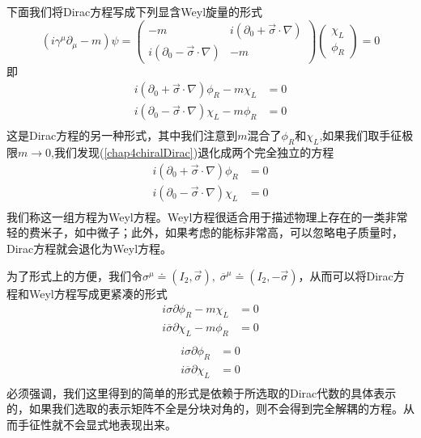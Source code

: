 下面我们将Dirac方程写成下列显含Weyl旋量的形式
\begin{equation}
    (i\gamma^{\mu}\partial_{\mu}-m)\psi=\left(\begin{array}{cc}
       -m  &i(\partial_{0}+\vec{\sigma}\cdot \nabla)  \\
       i(\partial_{0}-\vec{\sigma}\cdot \nabla)   & -m
    \end{array}\right)
    \left(\begin{array}{cc}
         \chi_{L}  \\
         \phi_{R} 
    \end{array}\right)=0
\end{equation}
即
\begin{equation}
\label{chap4chiralDirac}
    \begin{aligned}
    i(\partial_{0}+\vec{\sigma}\cdot \nabla) \phi_{R}-m\chi_{L}&=0\\
    i(\partial_{0}-\vec{\sigma}\cdot \nabla) \chi_{L}-m\phi_{R}&=0\\
    \end{aligned}
\end{equation}
这是Dirac方程的另一种形式，其中我们注意到$m$混合了$\phi_{R}$和$\chi_{L}$,如果我们取手征极限$m\longrightarrow 0$,我们发现(\ref{chap4chiralDirac})退化成两个完全独立的方程
\begin{equation}
\label{chap4chiralDiracm0}
    \begin{aligned}
    i(\partial_{0}+\vec{\sigma}\cdot \nabla) \phi_{R}&=0\\
    i(\partial_{0}-\vec{\sigma}\cdot \nabla) \chi_{L}&=0\\
    \end{aligned}
\end{equation}
我们称这一组方程为Weyl方程。Weyl方程很适合用于描述物理上存在的一类非常轻的费米子，如中微子；此外，如果考虑的能标非常高，可以忽略电子质量时，Dirac方程就会退化为Weyl方程。

为了形式上的方便，我们令$\sigma^{\mu}\doteq(I_{2},\vec{\sigma}),\;\overline{\sigma}^{\mu}\doteq(I_{2},-\vec{\sigma})$，从而可以将Dirac方程和Weyl方程写成更紧凑的形式
\begin{equation}
    \begin{aligned}
    i\sigma\partial \phi_{R}-m\chi_{L}&=0\\
    i\overline{\sigma}\partial \chi_{L}-m\phi_{R}&=0\\
    \end{aligned}
\end{equation}
\begin{equation}
    \begin{aligned}
    i\sigma\partial \phi_{R}&=0\\
    i\overline{\sigma}\partial \chi_{L}&=0\\
    \end{aligned}
\end{equation}
必须强调，我们这里得到的简单的形式是依赖于所选取的Dirac代数的具体表示的，如果我们选取的表示矩阵不全是分块对角的，则不会得到完全解耦的方程。从而手征性就不会显式地表现出来。

